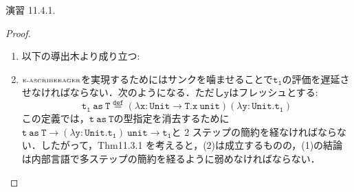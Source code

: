 \documentclass[9pt]{beamer}
\begin{document}
\begin{frame}{演習 11.4.1.}
\begin{proof}
\begin{enumerate}
\item 以下の導出木より成り立つ:\begin{prooftree}
\end{prooftree}
\item $\text{\tiny\rm{E-ASCRIBEEAGER}}$を実現するためにはサンクを噛ませることで$\mathtt{t_{1}}$の評価を遅延させなければならない．次のようになる．ただし$\mathtt{y}$はフレッシュとする:\begin{equation*}
\mathtt{t_{1}\ as\ T \stackrel{def}{=} (\lambda x: Unit\rightarrow T. x\ unit)(\lambda y:Unit.  t_{1})}
\end{equation*}
この定義では，$\mathtt{t\ as\ T}$の型指定を消去するために$\mathtt{t\ as\ T\rightarrow (\lambda y : Unit. t_{1})\ unit\rightarrow t_{1}}$と 2 ステップの簡約を経なければならない．したがって，Thm11.3.1 を考えると，(2)は成立するものの，(1)の結論は内部言語で多ステップの簡約を経るように弱めなければならない．
\end{enumerate}
\end{proof}
\end{frame}
\end{document}
